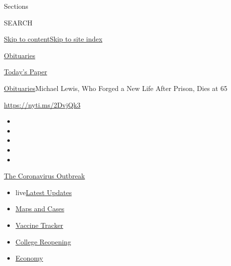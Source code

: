 Sections

SEARCH

\protect\hyperlink{site-content}{Skip to
content}\protect\hyperlink{site-index}{Skip to site index}

\href{https://www.nytimes.com/section/obituaries}{Obituaries}

\href{https://myaccount.nytimes.com/auth/login?response_type=cookie\&client_id=vi}{}

\href{https://www.nytimes.com/section/todayspaper}{Today's Paper}

\href{/section/obituaries}{Obituaries}\textbar{}Michael Lewis, Who
Forged a New Life After Prison, Dies at 65

\url{https://nyti.ms/2DvjQk3}

\begin{itemize}
\item
\item
\item
\item
\item
\end{itemize}

\href{https://www.nytimes.com/news-event/coronavirus?action=click\&pgtype=Article\&state=default\&region=TOP_BANNER\&context=storylines_menu}{The
Coronavirus Outbreak}

\begin{itemize}
\tightlist
\item
  live\href{https://www.nytimes.com/2020/08/03/world/coronavirus-covid-19.html?action=click\&pgtype=Article\&state=default\&region=TOP_BANNER\&context=storylines_menu}{Latest
  Updates}
\item
  \href{https://www.nytimes.com/interactive/2020/us/coronavirus-us-cases.html?action=click\&pgtype=Article\&state=default\&region=TOP_BANNER\&context=storylines_menu}{Maps
  and Cases}
\item
  \href{https://www.nytimes.com/interactive/2020/science/coronavirus-vaccine-tracker.html?action=click\&pgtype=Article\&state=default\&region=TOP_BANNER\&context=storylines_menu}{Vaccine
  Tracker}
\item
  \href{https://www.nytimes.com/2020/08/02/us/covid-college-reopening.html?action=click\&pgtype=Article\&state=default\&region=TOP_BANNER\&context=storylines_menu}{College
  Reopening}
\item
  \href{https://www.nytimes.com/live/2020/08/03/business/stock-market-today-coronavirus?action=click\&pgtype=Article\&state=default\&region=TOP_BANNER\&context=storylines_menu}{Economy}
\end{itemize}

